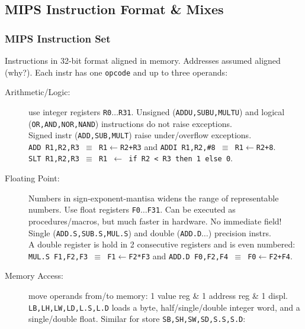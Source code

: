 \documentclass{beamer}
\newcommand{\emp}[1]{\textcolor{DikuRed}{ #1}}
\begin{document}
\subsection{MIPS Instruction Format \& Mixes}

\begin{frame}[fragile,t]
\frametitle{MIPS Instruction Set}

Instructions in 32-bit format aligned in memory. Addresses assumed aligned (why?).
%
Each instr has one {\tt opcode} and up to three operands:\smallskip
\begin{scriptsize}
\begin{description}
\item[Arithmetic/Logic:] use integer registers {\tt R0$\ldots$R31}.
                         Unsigned ({\tt ADDU,SUBU,MULTU}) and logical ({\tt OR,AND,NOR,NAND}) 
                         instructions do not raise exceptions.\\
                         Signed instr ({\tt ADD,SUB,MULT}) raise under/overflow exceptions.\\
                         {\tt ADD R1,R2,R3 $\equiv$ R1$\leftarrow$R2+R3} and
                         {\tt ADDI R1,R2,\#8 $\equiv$ R1$\leftarrow$R2+8}.\\
                         {\tt SLT R1,R2,R3 $\equiv$ R1 $\leftarrow$ if R2 < R3 then 1 else 0}.\smallskip
\item[Floating Point:]   Numbers in sign-exponent-mantisa widens the range of representable numbers.
                         Use float registers {\tt F0$\ldots$F31}. Can be executed as procedures/macros,
                         but much faster in hardware. No immediate field!\\
                         Single ({\tt ADD.S,SUB.S,MUL.S}) and double ({\tt ADD.D$\ldots$})
                         precision instrs.\\ 
                         \emp{A double register is hold in 2 consecutive registers and is even numbered:}\\
                         {\tt MUL.S F1,F2,F3 $\equiv$ F1$\leftarrow$F2*F3} and
                         {\tt ADD.D F0,F2,F4 $\equiv$ F0$\leftarrow$F2+F4}.\smallskip
\item[Memory Access:] move operands from/to memory: 1 value reg \& 1 address reg \& 1 displ.\\
                      {\tt LB,LH,LW,LD,L.S,L.D} loads a byte, half/single/double integer word,
                        and a single/double float. Similar for store {\tt SB,SH,SW,SD,S.S,S.D}:\\

\end{description}
\end{scriptsize}
\end{frame}
\end{document}
